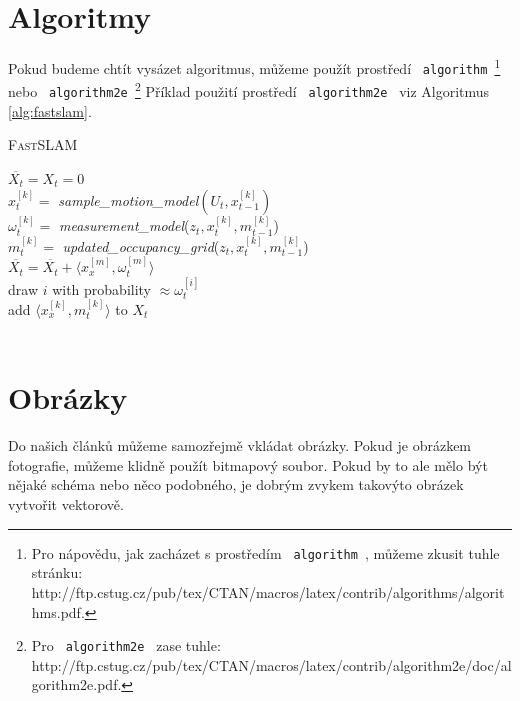 \documentclass[11pt,a4paper]{article}
\begin{document}
\section{Algoritmy} \label{sec:algoritmy}
Pokud budeme chtít vysázet algoritmus, můžeme použít prostředí \texttt{ algorithm }\footnote{Pro nápovědu, jak zacházet s prostředím \texttt{ algorithm }, můžeme zkusit tuhle stránku: http://ftp.cstug.cz/pub/tex/CTAN/macros/latex/contrib/algorithms/algorithms.pdf.} nebo \texttt{ algorithm2e }\footnote{Pro \texttt{ algorithm2e } zase tuhle: http://ftp.cstug.cz/pub/tex/CTAN/macros/latex/contrib/algorithm2e/doc/algorithm2e.pdf.} Příklad použití prostředí \texttt{ algorithm2e } viz Algoritmus \ref{alg:fastslam}.

\bigskip
{}
\begin{algorithm}[H]
\caption{\textsc{Fast}SLAM}
\label{alg:fastslam}
\SetNlSty{}{}{:  }
\SetInd{1em}{1em}
\SetNlSkip{-1.33em}
\BlankLine
\Indp \Indp
	$\overline{X_t} = X_t = 0$ \\
	{
	$x_t^{[k]} =$ \emph{sample\_motion\_model}$(U_t, x_{t-1}^{[k]})$\\
		$\omega_t^{[k]} = $ \emph{measurement\_model}($z_t, x_t^{[k]}, m_{t-1}^{[k]}$) \\
		$m_t^{[k]} = $ \emph{updated\_occupancy\_grid}($z_t, x_t^{[k]}, m_{t-1}^{[k]}$) \\
		$\overline{X_t} = \overline{X_t} + \langle x_x^{[m]}, \omega_t^{[m]}\rangle$ \\
	}
	{
		draw $i$ with probability $\approx \omega_t^{[i]}$ \\
		add $\langle x_x^{[k]}, m_t^{[k]}\rangle$ to $X_t$ \\
	}
	 \\
		
\end{algorithm}
\bigskip

\section{Obrázky}
Do našich článků můžeme samozřejmě vkládat obrázky. Pokud je obrázkem fotografie, můžeme klidně použít bitmapový soubor. Pokud by to ale mělo být nějaké schéma nebo něco podobného, je dobrým zvykem takovýto obrázek vytvořit vektorově.
\end{document}
